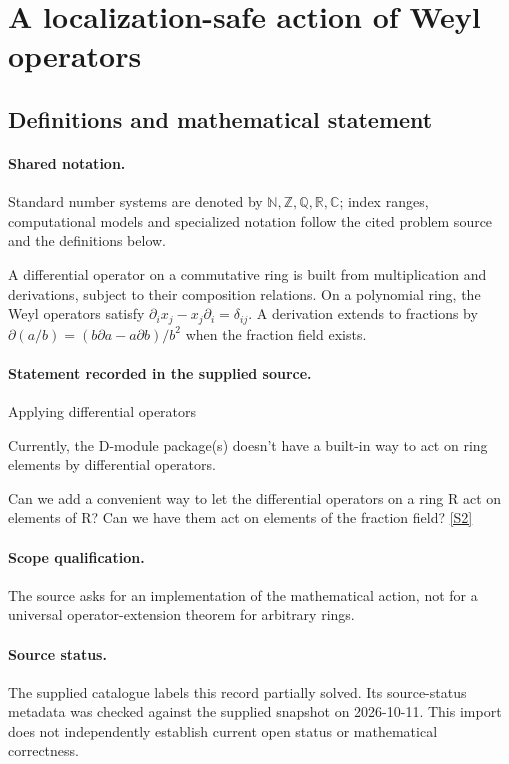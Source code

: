 \documentclass[11pt]{article}
\newcommand{\sref}[2]{\hyperlink{source:#1:#2}{[S#2]}}
\begin{document}
\section{A localization-safe action of Weyl operators}\label{statement}

\subsection{Definitions and mathematical statement}

\paragraph{Shared notation.}Standard number systems are denoted by $\mathbb N,\mathbb Z,\mathbb Q,\mathbb R,\mathbb C$; index ranges, computational models and specialized notation follow the cited problem source and the definitions below.


A differential operator on a commutative ring is built from multiplication and derivations, subject to their composition relations. On a polynomial ring, the Weyl operators satisfy $\partial_i x_j-x_j\partial_i=\delta_{ij}$. A derivation extends to fractions by $\partial(a/b)=(b\partial a-a\partial b)/b^2$ when the fraction field exists.
\paragraph{Statement recorded in the supplied source.}
Applying differential operators

Currently, the D-module package(s) doesn't have a built-in way to act on ring elements by differential operators.

Can we add a convenient way to let the differential operators on a ring R act on elements of R? Can we have them act on elements of the fraction field? \sref{statement}{2}
\paragraph{Scope qualification.}
The source asks for an implementation of the mathematical action, not for a universal operator-extension theorem for arbitrary rings.
\paragraph{Source status.}
The supplied catalogue labels this record partially solved. Its source-status metadata was checked against the supplied snapshot on 2026-10-11. This import does not independently establish current open status or mathematical correctness.
\end{document}
